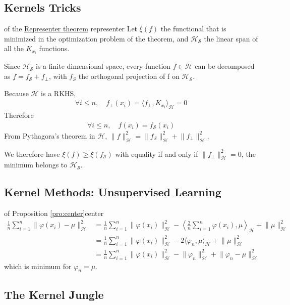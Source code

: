 \documentclass[10pt]{article}
\begin{document}
\subsection{Kernels Tricks}

\begin{Proof}{of the \hyperref[thm:representer]{Representer theorem}}
  {representer}
  Let $\xi(f)$ the functional that is minimized in the optimization problem of 
  the  theorem, and $\mathcal{H}_\mathcal{S}$ the linear span of all the 
  $K_{x_i}$ functions. 
  
  Since $\mathcal{H}_\mathcal{S}$ is a finite dimensional space, every function 
  $f\in\mathcal{H}$ can be decomposed as $f = f_\mathcal{S} + f_\perp$, with 
  $f_S$ the orthogonal projection of f on $\mathcal{H}_\mathcal{S}$.

  Because $\mathcal{H}$ is a RKHS, 
  \begin{align*}
    \forall i \leq n,\quad f_\perp(x_i) = \langle f_\perp, K_{x_i} 
    \rangle_\mathcal{H} = 0
  \end{align*}
  Therefore 
  \begin{align*}
    \forall  i \leq n,\quad f(x_i) = f_\mathcal{S}(x_i)
  \end{align*}
  From Pythagora's theorem in $\mathcal{H}$, $\lVert f\rVert^2_\mathcal{H} = 
  \lVert f_\mathcal{S}\rVert^2_\mathcal{H} + \lVert f_\perp
  \rVert^2_\mathcal{H}$.

  We therefore have $\xi(f) \geq \xi(f_\mathcal{S})$ with equality if and only
  if $\lVert f_\perp\rVert^2_\mathcal{H} = 0$, the minimum belongs to 
  $\mathcal{H}_\mathcal{S}$.
\end{Proof}

\subsection{Kernel Methods: Unsupervised Learning}

\begin{Proof}{of Proposition \ref{pro:center}}{center}
  \begin{align*}
    \frac{1}{n}\sum_{i=1}^n \lVert \varphi(x_i) - \mu \rVert^2_\mathcal{H} & =
    \frac{1}{n}\sum_{i=1}^n \lVert \varphi(x_i)\rVert^2_\mathcal{H} - \left
    \langle \frac{2}{n}\sum_{i=1}^n\varphi(x_i), \mu \right\rangle_\mathcal{H} 
    + \lVert\mu \rVert^2_\mathcal{H}\\
    & = \frac{1}{n}\sum_{i=1}^n \lVert \varphi(x_i)\rVert^2_\mathcal{H} - 2 
    \langle \varphi_n, \mu \rangle_\mathcal{H} + \lVert\mu \rVert^2_\mathcal{H}
    \\
    & = \frac{1}{n}\sum_{i=1}^n \lVert \varphi(x_i)\rVert^2_\mathcal{H} - \lVert
    \varphi_n \rVert^2_\mathcal{H} + \lVert \varphi_n - \mu \rVert^2_\mathcal{H}
  \end{align*}
  which is minimum for $\varphi_n = \mu$.
\end{Proof}

\subsection{The Kernel Jungle}

\begin{Proof}{}{}
  
\end{Proof}
\end{document}
